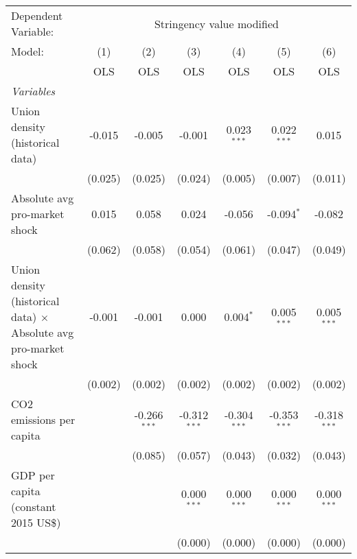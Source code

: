 
\begingroup
\centering
\begin{tabular}{lcccccc}
   \toprule
   Dependent Variable: & \multicolumn{6}{c}{Stringency value modified}\\
   Model:                                                                  & (1)     & (2)            & (3)            & (4)            & (5)            & (6)\\  
                                                                           &  OLS    & OLS            & OLS            & OLS            & OLS            & OLS\\  
   \midrule
   \emph{Variables}\\
   Union density (historical data)                                         & -0.015  & -0.005         & -0.001         & 0.023$^{***}$  & 0.022$^{***}$  & 0.015\\   
                                                                           & (0.025) & (0.025)        & (0.024)        & (0.005)        & (0.007)        & (0.011)\\   
   Absolute avg pro-market shock                                           & 0.015   & 0.058          & 0.024          & -0.056         & -0.094$^{*}$   & -0.082\\   
                                                                           & (0.062) & (0.058)        & (0.054)        & (0.061)        & (0.047)        & (0.049)\\   
   Union density (historical data) $\times$ Absolute avg pro-market shock  & -0.001  & -0.001         & 0.000          & 0.004$^{*}$    & 0.005$^{***}$  & 0.005$^{***}$\\   
                                                                           & (0.002) & (0.002)        & (0.002)        & (0.002)        & (0.002)        & (0.002)\\   
   CO2 emissions per capita                                                &         & -0.266$^{***}$ & -0.312$^{***}$ & -0.304$^{***}$ & -0.353$^{***}$ & -0.318$^{***}$\\   
                                                                           &         & (0.085)        & (0.057)        & (0.043)        & (0.032)        & (0.043)\\   
   GDP per capita (constant 2015 US\$)                                     &         &                & 0.000$^{***}$  & 0.000$^{***}$  & 0.000$^{***}$  & 0.000$^{***}$\\   
                                                                           &         &                & (0.000)        & (0.000)        & (0.000)        & (0.000)\\   

\end{tabular}
